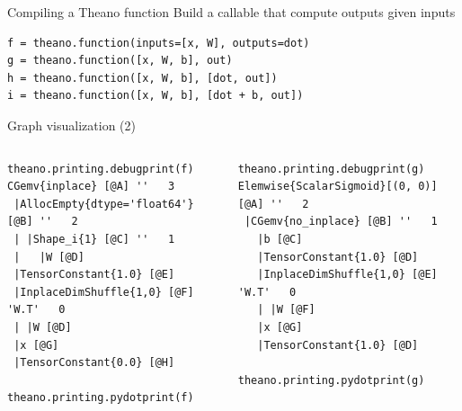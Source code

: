 \documentclass[a4paper,9pt]{beamer}
\begin{document}
\begin{frame}[fragile]{Compiling a Theano function}
  Build a callable that compute outputs given inputs
  \begin{verbatim}
f = theano.function(inputs=[x, W], outputs=dot)
g = theano.function([x, W, b], out)
h = theano.function([x, W, b], [dot, out])
i = theano.function([x, W, b], [dot + b, out])
  \end{verbatim}
\end{frame}

\begin{frame}[fragile]{Graph visualization (2)}
  \begin{columns}
    \begin{column}{0.48\textwidth}
\footnotesize
      \begin{verbatim}
theano.printing.debugprint(f)
CGemv{inplace} [@A] ''   3
 |AllocEmpty{dtype='float64'} [@B] ''   2
 | |Shape_i{1} [@C] ''   1
 |   |W [@D]
 |TensorConstant{1.0} [@E]
 |InplaceDimShuffle{1,0} [@F] 'W.T'   0
 | |W [@D]
 |x [@G]
 |TensorConstant{0.0} [@H]

theano.printing.pydotprint(f)
      \end{verbatim}
    \end{column}
    \begin{column}{0.48\textwidth}
\footnotesize
      \begin{verbatim}
theano.printing.debugprint(g)
Elemwise{ScalarSigmoid}[(0, 0)] [@A] ''   2
 |CGemv{no_inplace} [@B] ''   1
   |b [@C]
   |TensorConstant{1.0} [@D]
   |InplaceDimShuffle{1,0} [@E] 'W.T'   0
   | |W [@F]
   |x [@G]
   |TensorConstant{1.0} [@D]

theano.printing.pydotprint(g)
      \end{verbatim}
    \end{column}
  \end{columns}
\end{frame}
\end{document}
